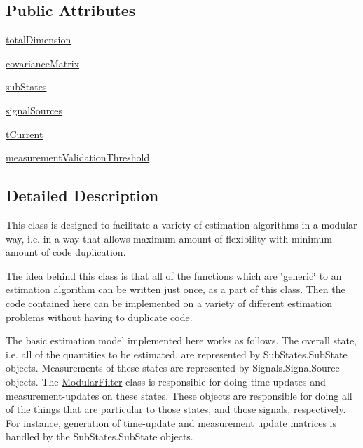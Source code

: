 \subsection*{Public Attributes}
\begin{DoxyCompactItemize}
\item 
\hyperlink{classmodest_1_1modularfilter_1_1ModularFilter_ae7028964e7e7adf58d75b76aef9783f6}{total\+Dimension}
\item 
\hyperlink{classmodest_1_1modularfilter_1_1ModularFilter_ac1b2e8a44ee25a8a2935e6e44a8409e5}{covariance\+Matrix}
\item 
\hyperlink{classmodest_1_1modularfilter_1_1ModularFilter_a80c66c525d5afd61271f13da47148c5d}{sub\+States}
\item 
\hyperlink{classmodest_1_1modularfilter_1_1ModularFilter_a545ac50ec6f67f29ad3420cfc5581812}{signal\+Sources}
\item 
\hyperlink{classmodest_1_1modularfilter_1_1ModularFilter_a917f511b39632b804f3ecf667f5a6d96}{t\+Current}
\item 
\hyperlink{classmodest_1_1modularfilter_1_1ModularFilter_af91295c2d8f45afe04386215b5fa39aa}{measurement\+Validation\+Threshold}
\end{DoxyCompactItemize}


\subsection{Detailed Description}
This class is designed to facilitate a variety of estimation algorithms in a modular way, i.\+e. in a way that allows maximum amount of flexibility with minimum amount of code duplication.

The idea behind this class is that all of the functions which are \char`\"{}generic\char`\"{} to an estimation algorithm can be written just once, as a part of this class. Then the code contained here can be implemented on a variety of different estimation problems without having to duplicate code.

The basic estimation model implemented here works as follows. The overall state, i.\+e. all of the quantities to be estimated, are represented by Sub\+States.\+Sub\+State objects. Measurements of these states are represented by Signals.\+Signal\+Source objects. The \hyperlink{classmodest_1_1modularfilter_1_1ModularFilter}{Modular\+Filter} class is responsible for doing time-\/updates and measurement-\/updates on these states. These objects are responsible for doing all of the things that are particular to those states, and those signals, respectively. For instance, generation of time-\/update and measurement update matrices is handled by the Sub\+States.\+Sub\+State objects. 

